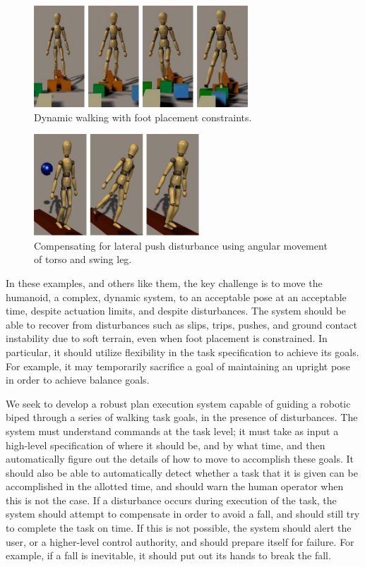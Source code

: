 \documentclass{llncs}
\begin{document}
\begin{figure}%
\centering
\includegraphics[height=1.5in]{WalkOnStonesIntro1}
\caption{Dynamic walking with foot placement constraints.}
\label{fig:WalkOnStonesIntro1}       
\end{figure}

\begin{figure}%
\centering
\includegraphics[height=1.5in]{LatPushIntro1}
\caption{Compensating for lateral push disturbance using angular movement of torso and swing leg.}
\label{fig:LatPushIntro1}       
\end{figure}

In these examples, and others like them, the key challenge is to move the humanoid,
a complex, dynamic system, to an acceptable pose at an acceptable time, despite actuation limits, and despite disturbances.
The system should be able to recover from disturbances such as slips, trips, pushes, and ground contact instability due to soft terrain, 
even when foot placement is constrained.  
In particular, it should utilize flexibility in the task specification to achieve its goals.
For example, it may temporarily sacrifice a goal of maintaining an upright pose in order to achieve balance goals.

We seek to develop a robust plan execution system capable of guiding a robotic biped through a series of walking task goals, in the presence of disturbances.  
The system must understand commands at the task level;  it must take as input a high-level specification of where it should be, and by what time, and then 
automatically figure out the details of how to move to accomplish these goals.  
It should also be able to automatically detect whether a task that it is given can be accomplished in the allotted time, and should warn the human operator 
when this is not the case.  
If a disturbance occurs during execution of the task, the system should attempt to compensate in order to avoid a fall, and should still try to 
complete the task on time.  
If this is not possible, the system should alert the user, or a higher-level control authority, and should prepare itself for failure.
For example, if a fall is inevitable, it should put out its hands to break the fall.
\end{document}
